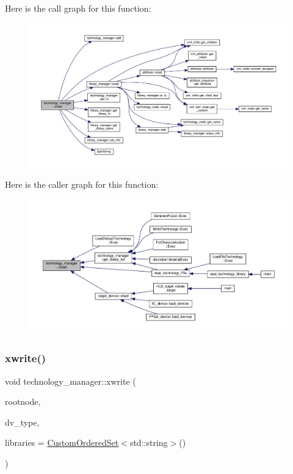 Here is the call graph for this function\+:
\nopagebreak
\begin{figure}[H]
\begin{center}
\leavevmode
\includegraphics[width=350pt]{df/dc7/classtechnology__manager_a3e17fc1041f0bb59220379c4c9ee0eb7_cgraph}
\end{center}
\end{figure}
Here is the caller graph for this function\+:
\nopagebreak
\begin{figure}[H]
\begin{center}
\leavevmode
\includegraphics[width=350pt]{df/dc7/classtechnology__manager_a3e17fc1041f0bb59220379c4c9ee0eb7_icgraph}
\end{center}
\end{figure}
\mbox{\label{classtechnology__manager_acba7aabee7df6c10583d4fa5e1c52d73}} 
\subsubsection{\texorpdfstring{xwrite()}{xwrite()}}
{\footnotesize\ttfamily void technology\+\_\+manager\+::xwrite (\begin{DoxyParamCaption}\item[{\hyperlink{classxml__element}{xml\+\_\+element} $\ast$}]{rootnode,  }\item[{\hyperlink{target__device_8hpp_a476becc690220f0805ce73006449c732}{Target\+Device\+\_\+\+Type}}]{dv\+\_\+type,  }\item[{const \hyperlink{classCustomOrderedSet}{Custom\+Ordered\+Set}$<$ std\+::string $>$ \&}]{libraries = {\ttfamily \hyperlink{classCustomOrderedSet}{Custom\+Ordered\+Set}$<$std\+:\+:string$>$()} }\end{DoxyParamCaption})}



